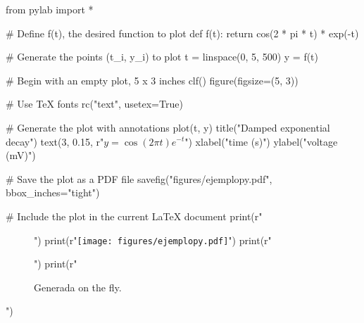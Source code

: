 \begin{pycode}
from pylab import *

# Define f(t), the desired function to plot
def f(t):
    return cos(2 * pi * t) * exp(-t)

# Generate the points (t_i, y_i) to plot
t = linspace(0, 5, 500)
y = f(t)

# Begin with an empty plot, 5 x 3 inches
clf()
figure(figsize=(5, 3))

# Use TeX fonts
rc("text", usetex=True)

# Generate the plot with annotations
plot(t, y)
title("Damped exponential decay")
text(3, 0.15, r"$y = \cos(2 \pi t) e^{-t}$")
xlabel("time (s)")
ylabel("voltage (mV)")

# Save the plot as a PDF file
savefig("figures/ejemplopy.pdf", bbox_inches="tight")

# Include the plot in the current LaTeX document
print(r"\begin{figure}[bhtp]\begin{center}")
print(r"\texttt{[image: figures/ejemplopy.pdf]}")
print(r"\caption{Generada on the fly.}\label{fig:onthefly}")
print(r"\end{center}\end{figure}")
\end{pycode}


